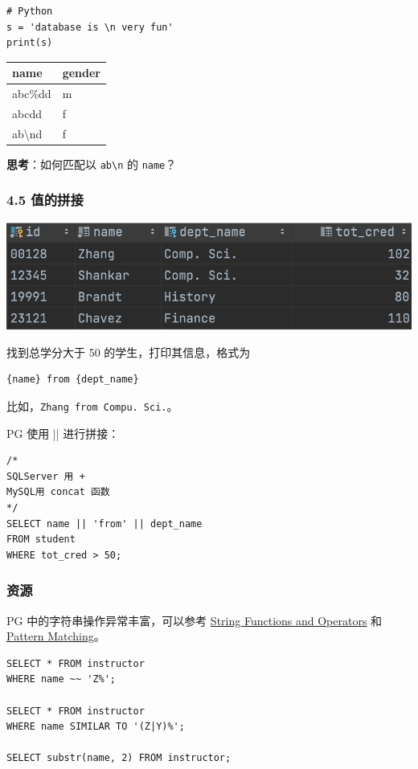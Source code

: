 \documentclass[aspectratio=169, 14pt]{beamer}
\begin{document}
\begin{frame}[fragile]
    \begin{verbatim} 
# Python
s = 'database is \n very fun'
print(s)
    \end{verbatim}
    \pause
    \begin{table}
        \begin{tabular}{ll}
          \toprule
          name & gender \\
          \midrule
          abc\%dd & m \\
          abcdd & f \\
          ab\textbackslash nd & f \\
          \bottomrule
        \end{tabular}
    \end{table}
\textbf{思考}：如何匹配以 \texttt{ab\textbackslash n} 的 \texttt{name}？
\end{frame}

\begin{frame}[fragile]
    \frametitle{4.5 值的拼接}
\includegraphics[width=.8\textwidth]{week4/cred}    

找到总学分大于 50 的学生，打印其信息，格式为

\begin{verbatim}
{name} from {dept_name}    
\end{verbatim}

比如，\texttt{Zhang from Compu. Sci.}。
\end{frame}

\begin{frame}[fragile]
PG 使用 \alert{||} 进行拼接：
    \begin{verbatim} 
/*
SQLServer 用 +
MySQL用 concat 函数
*/
SELECT name || 'from' || dept_name
FROM student
WHERE tot_cred > 50;
    \end{verbatim}

\end{frame}

\begin{frame}[fragile]
    \frametitle{资源}
PG 中的字符串操作异常丰富，可以参考 \href{https://www.postgresql.org/docs/14/functions-string.html}{String Functions and Operators} 和 \href{https://www.postgresql.org/docs/14/functions-matching.html}{Pattern Matching}。

\begin{verbatim} 
SELECT * FROM instructor
WHERE name ~~ 'Z%';

SELECT * FROM instructor
WHERE name SIMILAR TO '(Z|Y)%';

SELECT substr(name, 2) FROM instructor;
\end{verbatim}

\end{frame}
\end{document}

